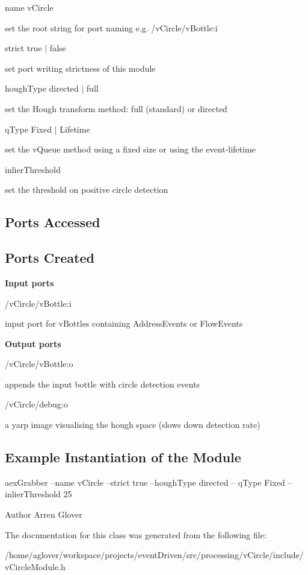 \begin{DoxyItemize}
\item {\ttfamily name} {\ttfamily v\-Circle} \par
 set the root string for port naming e.\-g. /v\-Circle/v\-Bottle\-:i
\item {\ttfamily strict} {\ttfamily true} $\vert$ false \par
 set port writing strictness of this module
\item {\ttfamily hough\-Type} {\ttfamily directed} $\vert$ full \par
 set the Hough transform method\-: full (standard) or directed
\item {\ttfamily q\-Type} {\ttfamily Fixed} $\vert$ Lifetime \par
 set the v\-Queue method using a fixed size or using the event-\/lifetime
\item {\ttfamily inlier\-Threshold} {} \par
 set the threshold on positive circle detection
\end{DoxyItemize}\hypertarget{group__aexGrabber_portsa_sec}{}\subsection{Ports Accessed}\label{group__aexGrabber_portsa_sec}
\hypertarget{group__aexGrabber_portsc_sec}{}\subsection{Ports Created}\label{group__aexGrabber_portsc_sec}
{\bfseries  Input ports }


\begin{DoxyItemize}
\item {\ttfamily /v\-Circle/v\-Bottle}\-:i \par
 input port for v\-Bottles containing Address\-Events or Flow\-Events
\end{DoxyItemize}

{\bfseries  Output ports }


\begin{DoxyItemize}
\item {\ttfamily /v\-Circle/v\-Bottle}\-:o \par
 appends the input bottle with circle detection events
\item {\ttfamily /v\-Circle/debug}\-:o \par
 a yarp image visualising the hough space (slows down detection rate)
\end{DoxyItemize}\hypertarget{group__aexGrabber_example_sec}{}\subsection{Example Instantiation of the Module}\label{group__aexGrabber_example_sec}
{\ttfamily aex\-Grabber --name v\-Circle --strict true --hough\-Type directed -- q\-Type Fixed --inlier\-Threshold 25 }

\begin{DoxyAuthor}{Author}
Arren Glover 
\end{DoxyAuthor}


The documentation for this class was generated from the following file\-:\begin{DoxyCompactItemize}
\item 
/home/aglover/workspace/projects/event\-Driven/src/processing/v\-Circle/include/v\-Circle\-Module.\-h\end{DoxyCompactItemize}
